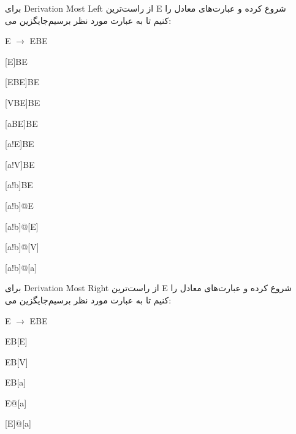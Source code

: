 
برای Derivation Most Left از راست‌ترین E شروع کرده و عبارت‌های معادل را جایگزین می‎‌کنیم تا به عبارت مورد نظر برسیم:

\setLTR


E {\LARGE $\rightarrow$} EBE  

\hspace{1em}{\LARGE $\rightarrow$} [E]BE   

\hspace{1em}{\LARGE $\rightarrow$} [EBE]BE  

\hspace{1em}{\LARGE $\rightarrow$} [VBE]BE  

\hspace{1em}{\LARGE $\rightarrow$} [aBE]BE 

\hspace{1em}{\LARGE $\rightarrow$} [a!E]BE 

\hspace{1em}{\LARGE $\rightarrow$} [a!V]BE 

\hspace{1em}{\LARGE $\rightarrow$} [a!b]BE 

\hspace{1em}{\LARGE $\rightarrow$} [a!b]@E 

\hspace{1em}{\LARGE $\rightarrow$} [a!b]@[E] 

\hspace{1em}{\LARGE $\rightarrow$} [a!b]@[V] 

\hspace{1em}{\LARGE $\rightarrow$}	[a!b]@[a] 



\setRTL
برای Derivation Most Right
از راست‌ترین E شروع کرده و عبارت‌های معادل را جایگزین می‎‌کنیم تا به عبارت مورد نظر برسیم:

\setLTR


E {\LARGE $\rightarrow$} EBE  

\hspace{1em}{\LARGE $\rightarrow$}  EB[E]

\hspace{1em}{\LARGE $\rightarrow$}  EB[V]

\hspace{1em}{\LARGE $\rightarrow$} EB[a]

\hspace{1em}{\LARGE $\rightarrow$}  E@[a]

\hspace{1em}{\LARGE $\rightarrow$} [E]@[a]

